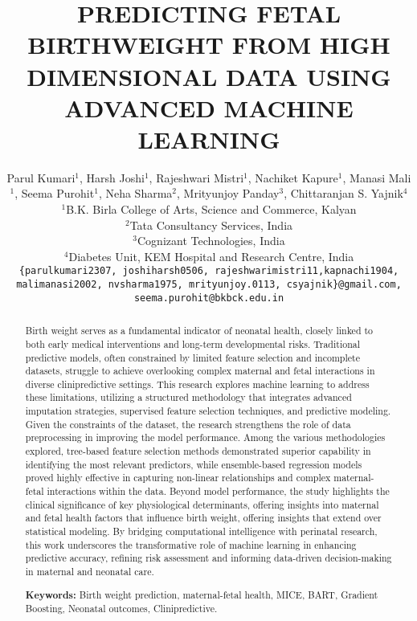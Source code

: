 \documentclass[12pt]{article}
\title{PREDICTING FETAL BIRTHWEIGHT FROM HIGH DIMENSIONAL DATA USING ADVANCED MACHINE LEARNING}
\author{Parul Kumari$^{1}$, Harsh Joshi$^{1}$, Rajeshwari Mistri$^{1}$, Nachiket Kapure$^{1}$,  Manasi Mali$^{1}$, Seema Purohit$^{1}$, Neha Sharma$^{2}$, Mrityunjoy Panday$^{3}$, Chittaranjan S. Yajnik$^{4}$ \\
$^1$B.K. Birla College of Arts, Science and Commerce, Kalyan \\
$^2$Tata Consultancy Services, India \\
$^3$Cognizant Technologies, India \\
$^4$Diabetes Unit, KEM Hospital and Research Centre, India \\ 
\vspace{0.5cm}
\texttt{\{parulkumari2307, joshiharsh0506, rajeshwarimistri11,kapnachi1904, malimanasi2002, nvsharma1975, mrityunjoy.0113, csyajnik\}@gmail.com, seema.purohit@bkbck.edu.in} \\
    }
\begin{document}
\maketitle

\begin{abstract}
Birth weight serves as a fundamental indicator of neonatal health, closely linked to both early medical interventions and long-term developmental risks. Traditional predictive models, often constrained by limited feature selection and incomplete datasets, struggle to achieve overlooking complex maternal and fetal interactions in diverse clinipredictive settings. This research explores machine learning to address these limitations, utilizing a structured methodology that integrates advanced imputation strategies, supervised feature selection techniques, and predictive modeling. Given the constraints of the dataset, the research strengthens the role of data preprocessing in improving the model performance. Among the various methodologies explored, tree-based feature selection methods demonstrated superior capability in identifying the most relevant predictors, while ensemble-based regression models proved highly effective in capturing non-linear relationships and complex maternal-fetal interactions within the data. Beyond model performance, the study highlights the clinical significance of key physiological determinants, offering insights into maternal and fetal health factors that influence birth weight, offering insights that extend over statistical modeling. By bridging computational intelligence with perinatal research, this work underscores the transformative role of machine learning in enhancing predictive accuracy, refining risk assessment and informing data-driven decision-making in maternal and neonatal care.

\noindent \textbf{Keywords:} Birth weight prediction, maternal-fetal health, MICE, BART, Gradient Boosting, Neonatal outcomes, Clinipredictive.
\end{abstract}
\end{document}
